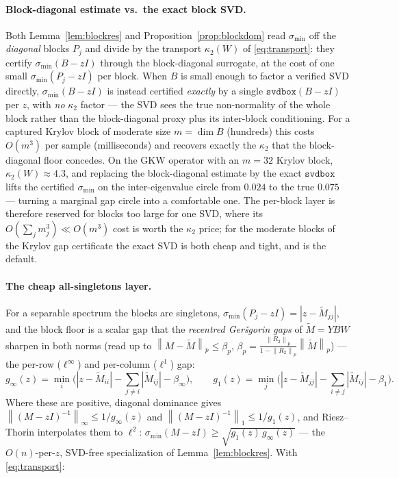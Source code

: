\documentclass[11pt,a4paper]{article}
\newcommand{\norm}[1]{\left\|#1\right\|}
\newcommand{\abs}[1]{\left|#1\right|}
\theoremstyle{plain}
\theoremstyle{definition}
\begin{document}
\paragraph{Block-diagonal estimate vs.\ the exact block SVD.} Both Lemma~\ref{lem:blockres}
and Proposition~\ref{prop:blockdom} read $\sigma_{\min}$ off the \emph{diagonal} blocks $P_j$
and divide by the transport $\kappa_2(W)$ of \eqref{eq:transport}: they certify
$\sigma_{\min}(B-zI)$ through the block-diagonal surrogate, at the cost of one small
$\sigma_{\min}(P_j-zI)$ per block. When $B$ is small enough to factor a verified SVD directly,
$\sigma_{\min}(B-zI)$ is instead certified \emph{exactly} by a single $\texttt{svdbox}(B-zI)$
per $z$, with \emph{no} $\kappa_2$ factor --- the SVD sees the true non-normality of the whole
block rather than the block-diagonal proxy plus its inter-block conditioning. For a captured
Krylov block of moderate size $m=\dim B$ (hundreds) this costs $O(m^3)$ per sample
(milliseconds) and recovers exactly the $\kappa_2$ that the block-diagonal floor concedes. On
the GKW operator with an $m=32$ Krylov block, $\kappa_2(W)\approx4.3$, and replacing the
block-diagonal estimate by the exact $\texttt{svdbox}$ lifts the certified $\sigma_{\min}$ on
the inter-eigenvalue circle from $0.024$ to the true $0.075$ --- turning a marginal gap circle
into a comfortable one. The per-block layer is therefore reserved for blocks too large for one
SVD, where its $O(\sum_j m_j^3)\ll O(m^3)$ cost is worth the $\kappa_2$ price; for the moderate
blocks of the Krylov gap certificate the exact SVD is both cheap and tight, and is the default.

\paragraph{The cheap all-singletons layer.} For a separable spectrum the blocks are
singletons, $\sigma_{\min}(P_j-zI)=\abs{z-\widetilde M_{jj}}$, and the block floor is a
scalar gap that the \emph{recentred Ger\v sgorin gaps} of $\widetilde M=YBW$ sharpen in both
norms (read up to $\norm{M-\widetilde M}_p\le\beta_p$,
$\beta_p=\tfrac{\norm{R_2}_p}{1-\norm{R_2}_p}\norm{\widetilde M}_p$) --- the per-row
($\ell^\infty$) and per-column ($\ell^1$) gap:
\[
  g_\infty(z)=\min_i\Big(\abs{z-\widetilde M_{ii}}-\!\sum_{j\ne i}\abs{\widetilde M_{ij}}-\beta_\infty\Big),
  \qquad
  g_1(z)=\min_j\Big(\abs{z-\widetilde M_{jj}}-\!\sum_{i\ne j}\abs{\widetilde M_{ij}}-\beta_1\Big).
\]
Where these are positive, diagonal dominance gives $\norm{(M-zI)^{-1}}_\infty\le 1/g_\infty(z)$
and $\norm{(M-zI)^{-1}}_1\le 1/g_1(z)$, and Riesz--Thorin interpolates them to $\ell^2$:
$\sigma_{\min}(M-zI)\ge\sqrt{g_1(z)\,g_\infty(z)}$ --- the $O(n)$-per-$z$, SVD-free
specialization of Lemma~\ref{lem:blockres}. With \eqref{eq:transport}:
\end{document}
